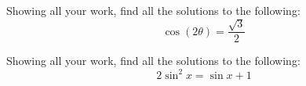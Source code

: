 \documentclass[11pt,letterpaper]{article}
\begin{document}

 Showing all your work, find all the solutions to the following:
	\[
	\cos(2\theta)= \dfrac{\sqrt{3}}{2}
	\]



\newpage



 Showing all your work, find all the solutions to the following:
	\[
	2 \sin^2 x= \sin x + 1
	\]
\end{document}
